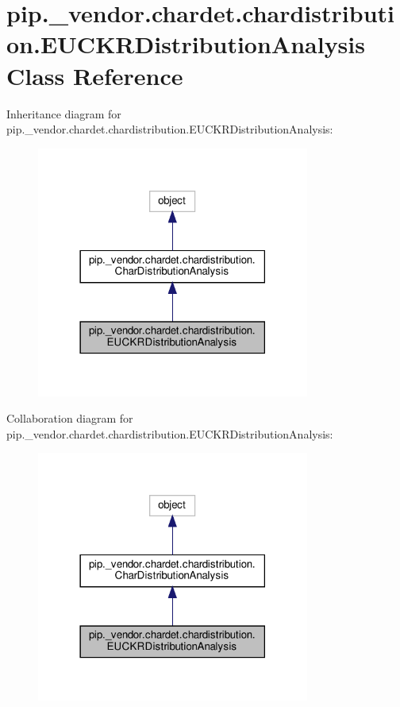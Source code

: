 \hypertarget{classpip_1_1__vendor_1_1chardet_1_1chardistribution_1_1EUCKRDistributionAnalysis}{}\section{pip.\+\_\+vendor.\+chardet.\+chardistribution.\+E\+U\+C\+K\+R\+Distribution\+Analysis Class Reference}
\label{classpip_1_1__vendor_1_1chardet_1_1chardistribution_1_1EUCKRDistributionAnalysis}


Inheritance diagram for pip.\+\_\+vendor.\+chardet.\+chardistribution.\+E\+U\+C\+K\+R\+Distribution\+Analysis\+:
\nopagebreak
\begin{figure}[H]
\begin{center}
\leavevmode
\includegraphics[width=254pt]{classpip_1_1__vendor_1_1chardet_1_1chardistribution_1_1EUCKRDistributionAnalysis__inherit__graph}
\end{center}
\end{figure}


Collaboration diagram for pip.\+\_\+vendor.\+chardet.\+chardistribution.\+E\+U\+C\+K\+R\+Distribution\+Analysis\+:
\nopagebreak
\begin{figure}[H]
\begin{center}
\leavevmode
\includegraphics[width=254pt]{classpip_1_1__vendor_1_1chardet_1_1chardistribution_1_1EUCKRDistributionAnalysis__coll__graph}
\end{center}
\end{figure}
